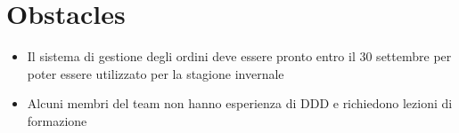 \section{Obstacles}
\begin{itemize}
  \item Il sistema di gestione degli ordini deve essere pronto entro il 30 settembre per poter essere utilizzato per la stagione invernale
  \item Alcuni membri del team non hanno esperienza di DDD e richiedono lezioni di formazione
\end{itemize}

